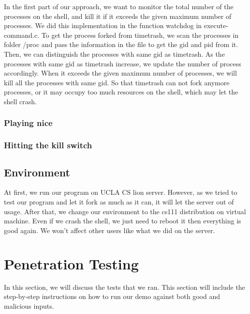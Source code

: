 \documentclass{article}
\begin{document}
In the first part of our approach, we want to monitor the total number of the processes on the shell, and kill it if it exceeds the given maximum number of processes.
We did this implementation in the function watchdog in execute-command.c.  To get the process forked from timetrash, we scan the processes in folder /proc and pass the information in the file to get the gid and pid from it.  Then, we can distinguish the processes with same gid as timetrash.  As the processes with same gid as timetrash increase, we update the number of process accordingly.  When it exceeds the given maximum number of processes, we will kill all the processes with same gid.  So that timetrash can not fork anymore processes, or it may occupy too much resources on the shell, which may let the shell crash. \\

\subsubsection{Playing nice}
\subsubsection{Hitting the kill switch}

\subsection{Environment}
At first, we run our program on UCLA CS lion server.  However, as we tried to test our program and let it fork as much as it can, it will let the server out of usage.  After that, we change our environment to the cs111 distribution on virtual machine.  Even if we crash the shell, we just need to reboot it then everything is good again.  We won’t affect other users like what we did on the server. \\ 


\section{Penetration Testing}

In this section, we will discuss the tests that we ran. This section will
include the step-by-step instructions on how to run our demo against both good
and malicious inputs.
\end{document}
